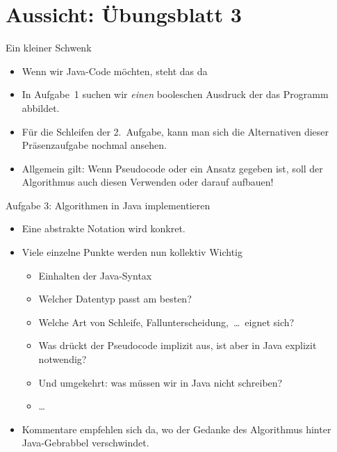 \section{Aussicht: Übungsblatt 3}
\begin{frame}{Ein kleiner Schwenk}
\begin{itemize}
    \itemsep8pt
    \item<2-> Wenn wir Java-Code möchten, steht das da 
    \item<3-> In Aufgabe~1 suchen wir \textit{einen} booleschen Ausdruck der das Programm abbildet. 
    \item<5-> Für die Schleifen der 2.~Aufgabe, kann man sich die Alternativen dieser Präsenzaufgabe nochmal ansehen.
    \item<6-> Allgemein gilt: Wenn Pseudocode oder ein Ansatz gegeben ist, soll der Algorithmus auch diesen Verwenden oder darauf aufbauen!
\end{itemize}
\end{frame}

\begin{frame}{Aufgabe 3: Algorithmen in Java implementieren}
    \begin{itemize}[<+(1)->]
        \itemsep12pt
        \item Eine abstrakte Notation wird konkret.
        \item Viele einzelne Punkte werden nun kollektiv Wichtig \begin{itemize}
            \itemsep3.5pt
            \item Einhalten der Java-Syntax
            \item Welcher Datentyp passt am besten?
            \item Welche Art von Schleife, Fallunterscheidung,~\ldots\ eignet sich?
            \item Was drückt der Pseudocode implizit aus, ist aber in Java explizit notwendig?
            \item Und umgekehrt: was müssen wir in Java nicht schreiben?
            \item \ldots
        \end{itemize}
        \item Kommentare empfehlen sich da, wo der Gedanke des Algorithmus hinter Java-\allowbreak Gebrabbel verschwindet. 
    \end{itemize}
\end{frame}

